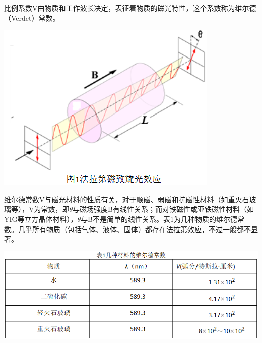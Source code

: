 \documentclass[hyperref]{ctexart}
\begin{document}
	比例系数V由物质和工作波长决定，表征着物质的磁光特性，这个系数称为维尔德（Verdet）常数。
	\begin{center}\includegraphics[scale=0.4]{t1}\end{center}

	维尔德常数V与磁光材料的性质有关，对于顺磁、弱磁和抗磁性材料（如重火石玻璃等），V为常数，即$\theta$与磁场强度B有线性关系；而对铁磁性或亚铁磁性材料（如YIG等立方晶体材料），$\theta$与B不是简单的线性关系。表1为几种物质的维尔德常数。几乎所有物质（包括气体、液体、固体）都存在法拉第效应，不过一般都不显著。
	\begin{center}\includegraphics[scale=0.4]{b1}\end{center}
\end{document}
